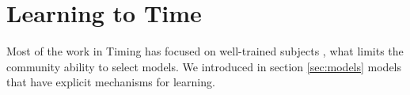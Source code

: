 \section{Learning to Time}
    Most of the work in Timing has focused on well-trained subjects \cite{}, what limits the community ability to select models. We introduced in section \ref{sec:models} models that have explicit mechanisms for learning.
    
